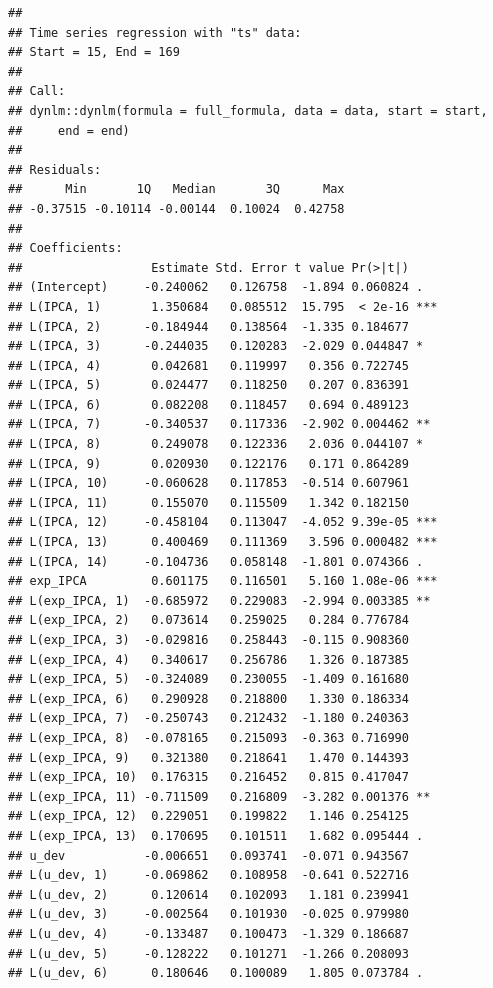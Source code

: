 \documentclass[
]{article}
\begin{document}
\begin{verbatim}
## 
## Time series regression with "ts" data:
## Start = 15, End = 169
## 
## Call:
## dynlm::dynlm(formula = full_formula, data = data, start = start, 
##     end = end)
## 
## Residuals:
##      Min       1Q   Median       3Q      Max 
## -0.37515 -0.10114 -0.00144  0.10024  0.42758 
## 
## Coefficients:
##                  Estimate Std. Error t value Pr(>|t|)    
## (Intercept)     -0.240062   0.126758  -1.894 0.060824 .  
## L(IPCA, 1)       1.350684   0.085512  15.795  < 2e-16 ***
## L(IPCA, 2)      -0.184944   0.138564  -1.335 0.184677    
## L(IPCA, 3)      -0.244035   0.120283  -2.029 0.044847 *  
## L(IPCA, 4)       0.042681   0.119997   0.356 0.722745    
## L(IPCA, 5)       0.024477   0.118250   0.207 0.836391    
## L(IPCA, 6)       0.082208   0.118457   0.694 0.489123    
## L(IPCA, 7)      -0.340537   0.117336  -2.902 0.004462 ** 
## L(IPCA, 8)       0.249078   0.122336   2.036 0.044107 *  
## L(IPCA, 9)       0.020930   0.122176   0.171 0.864289    
## L(IPCA, 10)     -0.060628   0.117853  -0.514 0.607961    
## L(IPCA, 11)      0.155070   0.115509   1.342 0.182150    
## L(IPCA, 12)     -0.458104   0.113047  -4.052 9.39e-05 ***
## L(IPCA, 13)      0.400469   0.111369   3.596 0.000482 ***
## L(IPCA, 14)     -0.104736   0.058148  -1.801 0.074366 .  
## exp_IPCA         0.601175   0.116501   5.160 1.08e-06 ***
## L(exp_IPCA, 1)  -0.685972   0.229083  -2.994 0.003385 ** 
## L(exp_IPCA, 2)   0.073614   0.259025   0.284 0.776784    
## L(exp_IPCA, 3)  -0.029816   0.258443  -0.115 0.908360    
## L(exp_IPCA, 4)   0.340617   0.256786   1.326 0.187385    
## L(exp_IPCA, 5)  -0.324089   0.230055  -1.409 0.161680    
## L(exp_IPCA, 6)   0.290928   0.218800   1.330 0.186334    
## L(exp_IPCA, 7)  -0.250743   0.212432  -1.180 0.240363    
## L(exp_IPCA, 8)  -0.078165   0.215093  -0.363 0.716990    
## L(exp_IPCA, 9)   0.321380   0.218641   1.470 0.144393    
## L(exp_IPCA, 10)  0.176315   0.216452   0.815 0.417047    
## L(exp_IPCA, 11) -0.711509   0.216809  -3.282 0.001376 ** 
## L(exp_IPCA, 12)  0.229051   0.199822   1.146 0.254125    
## L(exp_IPCA, 13)  0.170695   0.101511   1.682 0.095444 .  
## u_dev           -0.006651   0.093741  -0.071 0.943567    
## L(u_dev, 1)     -0.069862   0.108958  -0.641 0.522716    
## L(u_dev, 2)      0.120614   0.102093   1.181 0.239941    
## L(u_dev, 3)     -0.002564   0.101930  -0.025 0.979980    
## L(u_dev, 4)     -0.133487   0.100473  -1.329 0.186687    
## L(u_dev, 5)     -0.128222   0.101271  -1.266 0.208093    
## L(u_dev, 6)      0.180646   0.100089   1.805 0.073784 .  

\end{verbatim}
\end{document}
